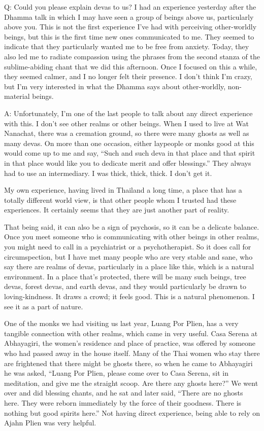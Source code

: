 \qaspace
Q: Could you please explain devas to us? I had an experience yesterday
after the Dhamma talk in which I may have seen a group of beings above
us, particularly above you. This is not the first experience I’ve had
with perceiving other-worldly beings, but this is the first time new
ones communicated to me. They seemed to indicate that they particularly
wanted me to be free from anxiety. Today, they also led me to radiate
compassion using the phrases from the second stanza of the
sublime-abiding chant that we did this afternoon. Once I focused on this
a while, they seemed calmer, and I no longer felt their presence. I
don’t think I’m crazy, but I’m very interested in what the Dhamma says
about other-worldly, non-material beings.

\qaspace
A: Unfortunately, I’m one of the last people to talk about any direct
experience with this. I don’t see other realms or other beings. When I
used to live at Wat Nanachat, there was a cremation ground, so there
were many ghosts as well as many devas. On more than one occasion,
either laypeople or monks good at this would come up to me and say,
“Such and such deva in that place and that spirit in that place would
like you to dedicate merit and offer blessings.” They always had to use
an intermediary. I was thick, thick, thick. I don’t get it.

My own experience, having lived in Thailand a long time, a place that
has a totally different world view, is that other people whom I trusted
had these experiences. It certainly seems that they are just another
part of reality.

That being said, it can also be a sign of psychosis, so it can be a
delicate balance. Once you meet someone who is communicating with other
beings in other realms, you might need to call in a psychiatrist or a
psychotherapist. So it does call for circumspection, but I have met many
people who are very stable and sane, who say there are realms of devas,
particularly in a place like this, which is a natural environment. In a
place that’s protected, there will be many such beings, tree devas,
forest devas, and earth devas, and they would particularly be drawn to
loving-kindness. It draws a crowd; it feels good. This is a natural
phenomenon. I see it as a part of nature.

One of the monks we had visiting us last year, Luang Por Plien, has a
very tangible connection with other realms, which came in very useful.
Casa Serena at Abhayagiri, the women’s residence and place of practice,
was offered by someone who had passed away in the house itself. Many of
the Thai women who stay there are frightened that there might be ghosts
there, so when he came to Abhayagiri he was asked, “Luang Por Plien,
please come over to Casa Serena, sit in meditation, and give me the
straight scoop. Are there any ghosts here?” We went over and did
blessing chants, and he sat and later said, “There are no ghosts here.
They were reborn immediately by the force of their goodness. There is
nothing but good spirits here.” Not having direct experience, being able
to rely on Ajahn Plien was very helpful.

